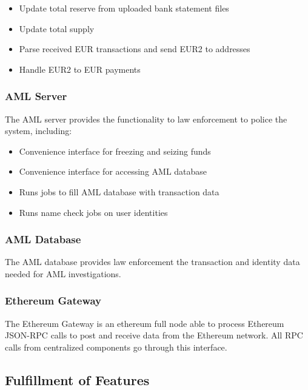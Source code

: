 \documentclass[a4paper,12pt]{article} %
\begin{document}
{\begin{itemize}
	\item Update total reserve from uploaded bank statement files
	\item Update total supply
	\item Parse received EUR transactions and send EUR2 to addresses
	\item Handle EUR2 to EUR payments
\end{itemize}

\subsubsection{AML Server} \label{sssec:3.5:amlServer}

The AML server provides the functionality to law enforcement to police the system, including:

\begin{itemize}
	\item Convenience interface for freezing and seizing funds
	\item Convenience interface for accessing AML database
	\item Runs jobs to fill AML database with transaction data
	\item Runs name check jobs on user identities
\end{itemize}

\subsubsection{AML Database} \label{sssec:3.5:amlDatabase}

The AML database provides law enforcement the transaction and identity data needed for AML investigations.

\subsubsection{Ethereum Gateway} \label{sssec:3.5:ethereumGateway}

The Ethereum Gateway is an ethereum full node able to process Ethereum JSON-RPC calls to post and receive data from the Ethereum network. All RPC calls from centralized components go through this interface.

\subsection{Fulfillment of Features} \label{ssec:3.6}

}
\end{document}
